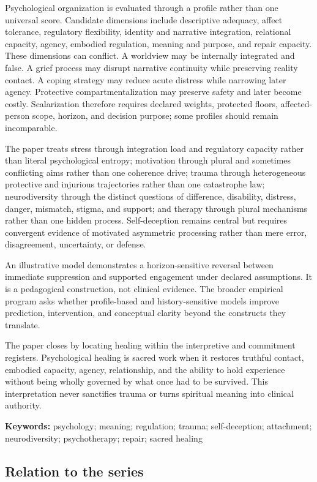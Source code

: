 \documentclass[
  11pt,
]{article}
\begin{document}
Psychological organization is evaluated through a profile rather than
one universal score. Candidate dimensions include descriptive adequacy,
affect tolerance, regulatory flexibility, identity and narrative
integration, relational capacity, agency, embodied regulation, meaning
and purpose, and repair capacity. These dimensions can conflict. A
worldview may be internally integrated and false. A grief process may
disrupt narrative continuity while preserving reality contact. A coping
strategy may reduce acute distress while narrowing later agency.
Protective compartmentalization may preserve safety and later become
costly. Scalarization therefore requires declared weights, protected
floors, affected-person scope, horizon, and decision purpose; some
profiles should remain incomparable.

The paper treats stress through integration load and regulatory capacity
rather than literal psychological entropy; motivation through plural and
sometimes conflicting aims rather than one coherence drive; trauma
through heterogeneous protective and injurious trajectories rather than
one catastrophe law; neurodiversity through the distinct questions of
difference, disability, distress, danger, mismatch, stigma, and support;
and therapy through plural mechanisms rather than one hidden process.
Self-deception remains central but requires convergent evidence of
motivated asymmetric processing rather than mere error, disagreement,
uncertainty, or defense.

An illustrative model demonstrates a horizon-sensitive reversal between
immediate suppression and supported engagement under declared
assumptions. It is a pedagogical construction, not clinical evidence.
The broader empirical program asks whether profile-based and
history-sensitive models improve prediction, intervention, and
conceptual clarity beyond the constructs they translate.

The paper closes by locating healing within the interpretive and
commitment registers. Psychological healing is sacred work when it
restores truthful contact, embodied capacity, agency, relationship, and
the ability to hold experience without being wholly governed by what
once had to be survived. This interpretation never sanctifies trauma or
turns spiritual meaning into clinical authority.

\textbf{Keywords:} psychology; meaning; regulation; trauma;
self-deception; attachment; neurodiversity; psychotherapy; repair;
sacred healing

\subsection{Relation to the series}\label{relation-to-the-series}
\end{document}
